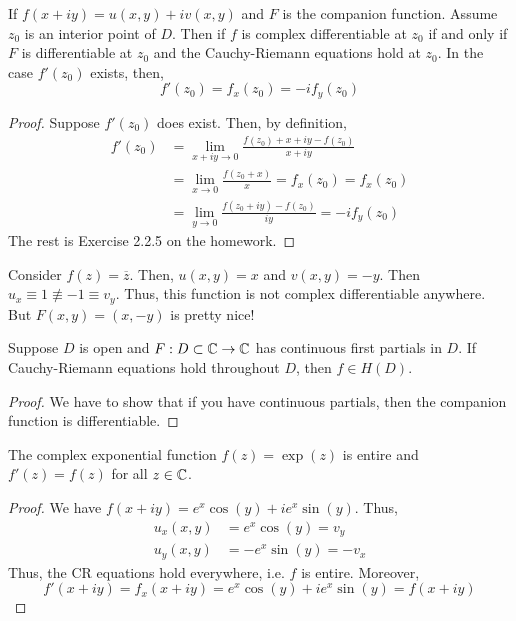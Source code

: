 \documentclass[12pt]{amsart}
\begin{document}
\begin{theorem}
    If $f(x+iy) = u(x,y) + iv(x,y)$ and $F$ is the companion function. Assume $z_0$ is an interior point of $D$. Then if $f$ is complex differentiable at $z_0$ if and only if $F$ is differentiable at $z_0$ and the Cauchy-Riemann equations hold at $z_0$. In the case $f'(z_0)$ exists, then, 
    \[ f'(z_0) = f_x(z_0) = -if_y(z_0)\]
\end{theorem}

\begin{proof}
    Suppose $f'(z_0)$ does exist. Then, by definition,
    \begin{align*}
        f'(z_0) &= \lim_{x+iy \to 0} \frac{f(z_0)+x+iy - f(z_0)}{x+iy} \\
        &= \lim_{x \to 0} \frac{f(z_0+x)}{x} = f_x(z_0)  = f_x(z_0)\\
        &= \lim_{y \to 0} \frac{f(z_0 + iy)-f(z_0)}{iy} = -if_y(z_0)
    \end{align*}
    The rest is Exercise 2.2.5 on the homework. 
\end{proof}

\begin{example}
    Consider $f(z) = \overline{z}$. Then, $u(x,y) = x$ and $v(x,y) = -y$. Then $u_x \equiv 1 \not \equiv -1 \equiv v_y$. Thus, this function is not complex differentiable anywhere. But $F(x,y) = (x,-y)$ is pretty nice!
\end{example}

\begin{theorem}[W 2.15]
    Suppose $D$ is open and $F: D \subset \mathbb C \to \mathbb C$ has continuous first partials in $D$. If Cauchy-Riemann equations hold throughout $D$, then $f \in H(D)$.
\end{theorem}

\begin{proof}
    We have to show that if you have continuous partials, then the companion function is differentiable. 
\end{proof}

\begin{corollary}
    The complex exponential function $f(z) = \exp(z)$ is entire and $f'(z) = f(z)$ for all $z \in \mathbb C$. 
\end{corollary}

\begin{proof}
    We have $f(x+iy) = e^x\cos(y) +ie^x\sin(y)$. Thus,
    \begin{align*}
        u_x(x,y) &= e^x\cos(y) = v_y \\
        u_y(x,y) &= -e^x\sin(y) = -v_x
    \end{align*}
    Thus, the CR equations hold everywhere, i.e. $f$ is entire. Moreover, 
    \[ f'(x+iy) = f_x(x+iy) = e^x\cos(y) + ie^x\sin(y) = f(x+iy)\]
\end{proof}
\end{document}
